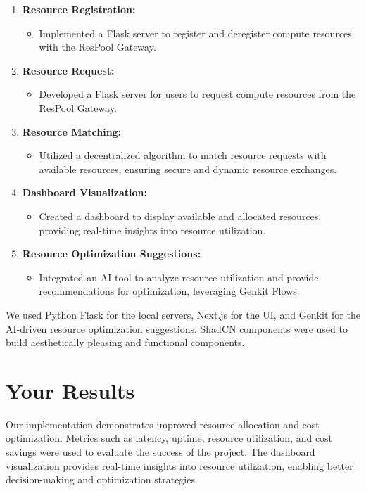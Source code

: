 \documentclass{article}
\begin{document}
\begin{enumerate}
    \item \textbf{Resource Registration:}
    \begin{itemize}
        \item Implemented a Flask server to register and deregister compute resources with the ResPool Gateway.
    \end{itemize}
    \item \textbf{Resource Request:}
    \begin{itemize}
        \item Developed a Flask server for users to request compute resources from the ResPool Gateway.
    \end{itemize}
    \item \textbf{Resource Matching:}
    \begin{itemize}
        \item Utilized a decentralized algorithm to match resource requests with available resources, ensuring secure and dynamic resource exchanges.
    \end{itemize}
    \item \textbf{Dashboard Visualization:}
    \begin{itemize}
        \item Created a dashboard to display available and allocated resources, providing real-time insights into resource utilization.
    \end{itemize}
    \item \textbf{Resource Optimization Suggestions:}
    \begin{itemize}
        \item Integrated an AI tool to analyze resource utilization and provide recommendations for optimization, leveraging Genkit Flows.
    \end{itemize}
\end{enumerate}

We used Python Flask for the local servers, Next.js for the UI, and Genkit for the AI-driven resource optimization suggestions. ShadCN components were used to build aesthetically pleasing and functional components.

\section{Your Results}

Our implementation demonstrates improved resource allocation and cost optimization. Metrics such as latency, uptime, resource utilization, and cost savings were used to evaluate the success of the project. The dashboard visualization provides real-time insights into resource utilization, enabling better decision-making and optimization strategies.
\end{document}

